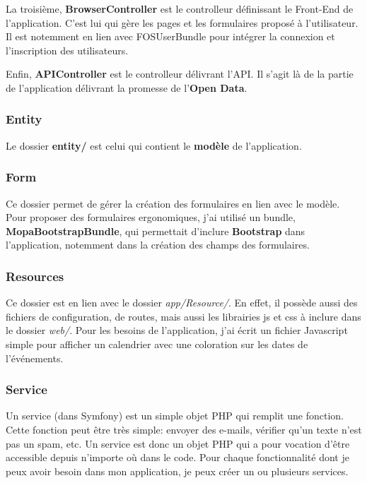 La troisième, \textbf{BrowserController} est le controlleur définissant le Front-End de l'application. C'est lui qui gère les pages et les formulaires proposé à l'utilisateur. Il est notemment en lien avec FOSUserBundle pour intégrer la connexion et l'inscription des utilisateurs.

Enfin, \textbf{APIController} est le controlleur délivrant l'API. Il s'agit là de la partie de l'application délivrant la promesse de l'\textbf{Open Data}.

\subsubsection*{Entity}

Le dossier \textbf{entity/} est celui qui contient le \textbf{modèle} de l'application.


\subsubsection*{Form}

Ce dossier permet de gérer la création des formulaires en lien avec le modèle. Pour proposer des formulaires ergonomiques, j'ai utilisé un bundle, \textbf{MopaBootstrapBundle}, qui permettait d'inclure \textbf{Bootstrap} dans l'application, notemment dans la création des champs des formulaires.


\subsubsection*{Resources}

Ce dossier est en lien avec le dossier \textit{app/Resource/}. En effet, il possède aussi des fichiers de configuration, de routes, mais aussi les librairies js et css à inclure dans le dossier \textit{web/}. Pour les besoins de l'application, j'ai écrit un fichier Javascript simple pour afficher un calendrier avec une coloration sur les dates de l'événements.


\subsubsection*{Service}

Un service (dans Symfony) est un simple objet PHP qui remplit une fonction. Cette fonction peut être très simple: envoyer des e-mails, vérifier qu'un texte n'est pas un spam, etc. Un service est donc un objet PHP qui a pour vocation d'être accessible depuis n'importe où dans le code. Pour chaque fonctionnalité dont je peux avoir besoin dans mon application, je peux créer un ou plusieurs services.

